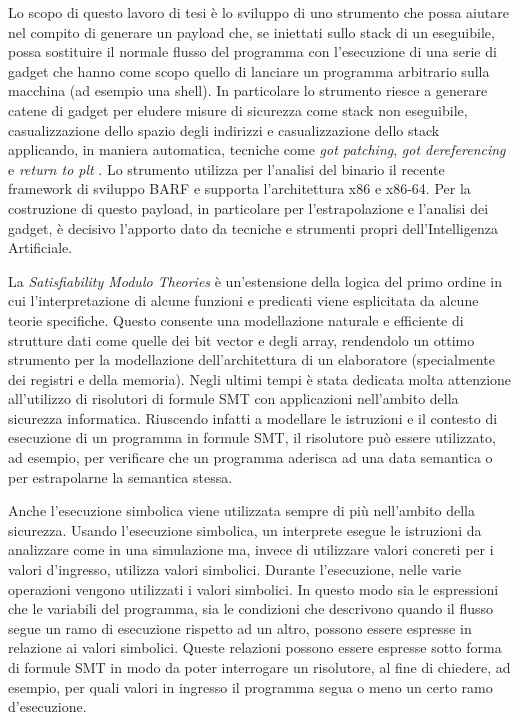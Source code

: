 Lo scopo di questo lavoro di tesi \`{e} lo sviluppo di uno strumento che
possa aiutare nel compito di generare un payload che, se iniettati
sullo stack di un eseguibile, possa sostituire il normale flusso del
programma con l'esecuzione di una serie di gadget che hanno come scopo
quello di lanciare un programma arbitrario sulla macchina (ad esempio
una shell). In particolare lo strumento riesce a generare catene di
gadget per eludere misure di sicurezza come stack non eseguibile,
casualizzazione dello spazio degli indirizzi e casualizzazione dello
stack applicando, in maniera automatica, tecniche come \emph{got
  patching}, \emph{got dereferencing} e \emph{return to plt}
\cite{roglia:2009}. Lo strumento utilizza per l'analisi del binario il
recente framework di sviluppo BARF \cite{Heitman-14} e supporta
l'architettura x86 e x86-64. Per la costruzione di questo payload, in
particolare per l'estrapolazione e l'analisi dei gadget, \`{e} decisivo
l'apporto dato da tecniche e strumenti propri dell'Intelligenza
Artificiale.

La \emph{Satisfiability Modulo Theories}\cite{Barrett-14} \`{e}
un'estensione della logica del primo ordine in cui l'interpretazione
di alcune funzioni e predicati viene esplicitata da alcune teorie
specifiche. Questo consente una modellazione naturale e efficiente di
strutture dati come quelle dei bit vector e degli array, rendendolo un
ottimo strumento per la modellazione dell'architettura di un
elaboratore (specialmente dei registri e della memoria). Negli ultimi
tempi \`{e} stata dedicata molta attenzione all'utilizzo di risolutori di
formule SMT con applicazioni nell'ambito della sicurezza
informatica\cite{Vanegue:2012}. Riuscendo infatti a modellare le
istruzioni e il contesto di esecuzione di un programma in formule SMT,
il risolutore pu\`{o} essere utilizzato, ad esempio, per verificare che un
programma aderisca ad una data semantica o per estrapolarne la
semantica stessa.

Anche l'esecuzione simbolica viene utilizzata sempre di pi\`{u}
nell'ambito della sicurezza. Usando l'esecuzione simbolica, un interprete
esegue le istruzioni da analizzare come in una simulazione ma, invece
di utilizzare valori concreti per i valori d'ingresso, utilizza valori
simbolici. Durante l'esecuzione, nelle varie operazioni vengono
utilizzati i valori simbolici. In questo modo sia le espressioni che
le variabili del programma, sia le condizioni che descrivono quando il
flusso segue un ramo di esecuzione rispetto ad un altro, possono
essere espresse in relazione ai valori simbolici.  Queste relazioni
possono essere espresse sotto forma di formule SMT in modo da poter
interrogare un risolutore, al fine di chiedere, ad esempio, per quali valori
in ingresso il programma segua o meno un certo ramo d'esecuzione.

